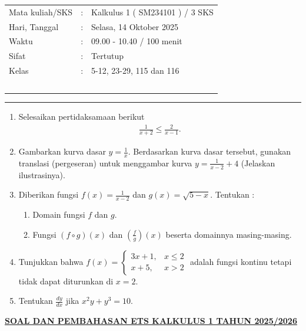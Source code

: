 \documentclass[10pt,openany,a4paper]{article}
\theoremstyle{definition}
\theoremstyle{definition}
\theoremstyle{plain}
\begin{document}
    \begin{center}
	\begin{tabular}{lcl}
		Mata kuliah/SKS & : & Kalkulus 1 ( SM234101 ) / 3 SKS\\
		Hari, Tanggal & : & Selasa, 14 Oktober 2025\\
		Waktu & : & 09.00 - 10.40 / 100 menit\\
		Sifat & : & Tertutup\\
		Kelas & : & 5-12, 23-29, 115 dan 116\\
  ~
	\end{tabular}
    
    \noindent\rule{\textwidth}{2.pt}
        \end{center}
        \begin{enumerate}
            \item Selesaikan pertidaksamaan berikut 
            \begin{align*}
                \frac{1}{x+2} \leq \frac{2}{x-1}.
            \end{align*}
            \item Gambarkan kurva dasar $y=\frac{1}{x}$. Berdasarkan kurva dasar tersebut, gunakan translasi (pergeseran) untuk menggambar kurva $y=\frac{1}{x-2}+4$ (Jelaskan ilustrasinya).
            \item Diberikan fungsi $f(x)=\frac{1}{x-2}$ dan $g(x)=\sqrt{5-x}$. Tentukan :
            \begin{enumerate}
                \item Domain fungsi $f$ dan $g$.
                \item Fungsi $(f\circ g)(x)$ dan $\left(\frac{f}{g}\right) (x)$ beserta domainnya masing-masing. 
            \end{enumerate}
            \item Tunjukkan bahwa $f(x)=\begin{cases}
                3x+1, &x\leq 2\\
                x+5, &x>2
            \end{cases}$ adalah fungsi kontinu tetapi tidak dapat diturunkan di $x=2$.
            \item Tentukan $\frac{dy}{dx}$ jika $x^2y+y^3=10$.
        \end{enumerate}
               \newpage
 \begin{center}
	{\underline{\textbf{\MakeUppercase{Soal dan Pembahasan ETS Kalkulus 1 Tahun 2025/2026}}}}
    \end{center}
\end{document}
